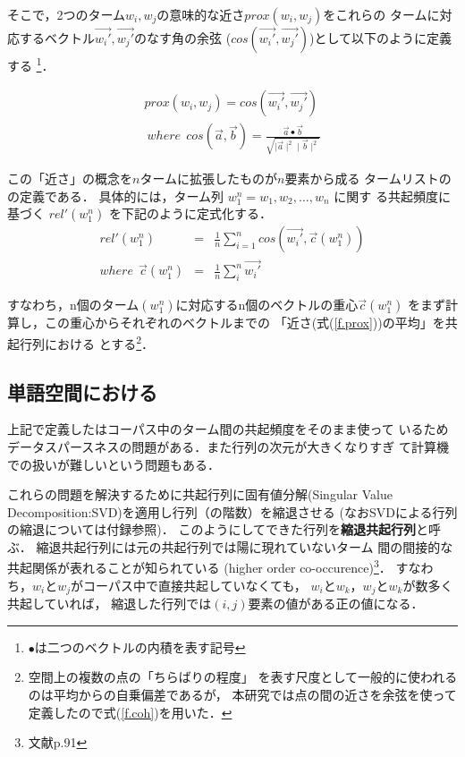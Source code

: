 そこで，2つのターム$w_i, w_j$の意味的な近さ$prox(w_i, w_j)$をこれらの
タームに対応するベクトル$\vec{w_i'}, \vec{w_j'}$のなす角の余弦
($cos(\vec{w_i'}, \vec{w_j'})$)として以下のように定義する
\footnote{$\bullet$は二つのベクトルの内積を表す記号}．

\begin{eqnarray}
prox(w_i, w_j)  =  cos(\vec{w_i'}, \vec{w_j'}) \label{f.prox}\\
\:  where \:\: cos(\vec{a}, \vec{b}) = 
\frac{\vec{a} \bullet \vec{b}}{ \sqrt{\mid \vec{a}
 \mid ^2  \mid \vec{b} \mid ^2}}\nonumber
\end{eqnarray}

この「近さ」の概念を$ n$タームに拡張したものが$n$要素から成る
タームリストの\ikd の定義である．
具体的には，ターム列 $  w_1^n = w_1, w_2, \ldots, w_n $ に関す
る共起頻度に基づく \ikd  $rel'(w_1^n)$ を下記のように定式化する．
\begin{eqnarray}
rel'(w_1^n) & = & \frac{1}{n}\sum_{i=1}^n cos(\vec{w_i'}, \vec{c}(w_1^n))  \label{f.coh}\\
where \:\: \vec{c}(w_1^n) & = &\frac{1}{n}\sum_i^n \vec{w_i'}  
\end{eqnarray}

すなわち，n個のターム$(w_1^n)$に対応するn個のベクトルの重心$\vec{c}(w_1^n)$
をまず計算し，この重心からそれぞれのベクトルまでの
「近さ(式(\ref{f.prox}))の平均」を共起行列における 
\ikd とする\footnote{空間上の複数の点の「ちらばりの程度」 
を表す尺度として一般的に使われるのは平均からの自乗偏差であるが，
本研究では点の間の近さを余弦を使って定義したので式(\ref{f.coh})を用いた．}．
 
\subsection{単語空間における\ikd }

  上記で定義した\kd はコーパス中のターム間の共起頻度をそのまま使って
いるためデータスパースネスの問題がある．また行列の次元が大きくなりすぎ
て計算機での扱いが難しいという問題もある．

これらの問題を解決するために共起行列に固有値分解(Singular Value
Decomposition:SVD)を適用し行列（の階数）を縮退させる
(なおSVDによる行列の縮退については付録参照)．
このようにしてできた行列を{\bf 縮退共起行列}と呼ぶ．
縮退共起行列には元の共起行列では陽に現れていないターム
間の間接的な共起関係が表れることが知られている
(higher order co-occurence)\footnote{文献\cite{Schuetze97}p.91}．
すなわち，$w_i$と$w_j$がコーパス中で直接共起していなくても，
$w_i$と$w_k$，$w_j$と$w_k$が数多く共起していれば，
縮退した行列では$(i,j)$要素の値がある正の値になる．

